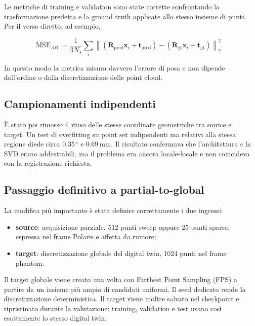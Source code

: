 \documentclass[11pt,a4paper]{article}
\newcommand{\R}{\mathbf{R}}
\newcommand{\tvec}{\mathbf{t}}
\newcommand{\x}{\mathbf{x}}
\newcommand{\SI}[2]{\ensuremath{#1\,#2}}
\newcommand{\milli}{\mathrm{m}}
\newcommand{\metre}{\mathrm{m}}
\newcommand{\degree}{^\circ}
\begin{document}
Le metriche di training e validation sono state corrette confrontando la
trasformazione predetta e la ground truth applicate allo stesso insieme di
punti. Per il verso diretto, ad esempio,

\begin{equation}
    \operatorname{MSE}_{AB}=
    \frac{1}{3N_s}\sum_i
    \left\|
      (\R_{\mathrm{pred}}\x_i+\tvec_{\mathrm{pred}})
      -(\R_{\mathrm{gt}}\x_i+\tvec_{\mathrm{gt}})
    \right\|_2^2.
\end{equation}

In questo modo la metrica misura davvero l'errore di posa e non dipende
dall'ordine o dalla discretizzazione delle point cloud.

\subsection{Campionamenti indipendenti}

È stato poi rimosso il riuso delle stesse coordinate geometriche tra source e
target. Un test di overfitting su point set indipendenti ma relativi alla stessa
regione diede circa \SI{0.35}{\degree} e \SI{0.69}{\milli\metre}. Il risultato
confermava che l'architettura e la SVD erano addestrabili, ma il problema era
ancora locale-locale e non coincideva con la registrazione richiesta.

\subsection{Passaggio definitivo a partial-to-global}

La modifica più importante è stata definire correttamente i due ingressi:

\begin{itemize}
    \item \textbf{source}: acquisizione parziale, 512 punti sweep oppure 25
    punti sparse, espressa nel frame Polaris e affetta da rumore;
    \item \textbf{target}: discretizzazione globale del digital twin, 1024
    punti nel frame phantom.
\end{itemize}

Il target globale viene creato una volta con Farthest Point Sampling (FPS) a
partire da un insieme più ampio di candidati uniformi. Il seed dedicato rende
la discretizzazione deterministica. Il target viene inoltre salvato nel
checkpoint e ripristinato durante la valutazione: training, validation e test
usano così esattamente lo stesso digital twin.
\end{document}
